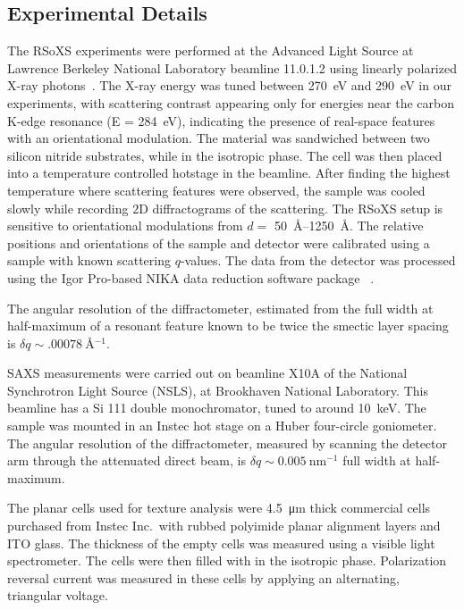 \documentclass[aagreenthesis]{subfiles}
\begin{document}
\subsection{Experimental Details}
The RSoXS experiments were performed at the Advanced Light Source at Lawrence
Berkeley National Laboratory beamline 11.0.1.2 using linearly polarized X-ray
photons~\cite{wang2011defining, liu2016resonant}. The X-ray energy was tuned
between \SI{270}{\eV} and \SI{290}{\electronvolt} in our experiments, with
scattering contrast appearing only for energies near the carbon K-edge resonance (E =
\SI{284}{\electronvolt}), indicating the presence of real-space features with an orientational modulation.
The  material was sandwiched between two silicon nitride substrates,
while in the isotropic phase. The cell was then placed into a temperature
controlled hotstage in the beamline.
After finding the highest temperature where scattering features were observed,
the sample was cooled slowly while recording $2$D diffractograms of the scattering. The
RSoXS setup is sensitive to orientational modulations from $d=$ \SIrange{50}{1250}{\angstrom}. The relative positions and orientations of the sample and detector were calibrated using a
sample with known scattering $q$-values. The data from the detector was processed using the
Igor Pro-based NIKA data reduction software package~ \cite{ilavsky2012nika, zhang2010glassy}.

The angular resolution of the diffractometer, estimated from the full width at
half-maximum of a resonant feature known to be twice the smectic layer spacing
is $\delta q \sim \SI{.00078}{\angstrom^{-1}}$.

SAXS measurements were carried out on beamline X10A of the National Synchrotron
Light Source (NSLS), at Brookhaven National Laboratory. This beamline has a Si 111 double monochromator, tuned to around \SI{10}{\kilo\electronvolt}. The sample was mounted in an Instec hot stage on a Huber four-circle goniometer.
%
The angular resolution of the diffractometer, measured by scanning the detector arm
through the attenuated direct beam, is $\delta q \sim
\SI{0.005}{\nano\metre^{-1}}$ full width at half-maximum.

The planar cells used for texture analysis were \SI{4.5}{\micro\metre} thick commercial cells purchased from Instec Inc.\ with rubbed polyimide planar alignment layers and ITO glass. The thickness of the empty cells was measured using a visible light spectrometer. The cells were then filled with  in the isotropic phase.  Polarization reversal current was measured in these cells by applying an alternating, triangular voltage.
\end{document}
